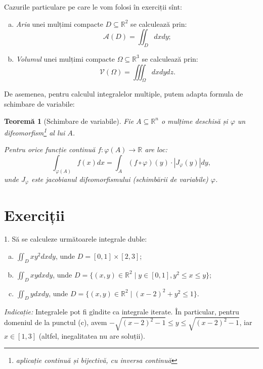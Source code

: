 \documentclass[11pt,a4paper]{article}
\newcommand\kal{\mathcal}
\newcommand\ds{\displaystyle}
\newcommand\seq{\subseteq}
\newcommand\RR{\mathbb{R}}
\theoremstyle{dotless}
\newtheorem{theorem}{Teorem\u{a}}[section]
\theoremstyle{dotlessdr}
\begin{document}
Cazurile particulare pe care le vom folosi în exerciții sînt:
\begin{enumerate}[(a)]
\item \emph{Aria} unei mulțimi compacte $D \seq \RR^2$ se calculează prin:
  \[
    \kal{A}(D) = \iint_D dxdy;
  \]
\item \emph{Volumul} unei mulțimi compacte $\Omega \seq \RR^3$ se calculează prin:
  \[
    \kal{V}(\Omega) = \iiint_\Omega dxdydz.
  \]
\end{enumerate}

De asemenea, pentru calculul integralelor multiple, putem adapta formula de
schimbare de variabile:

\begin{theorem}[Schimbare de variabile]\label{thm:sch-var}
  Fie $A \seq \RR^n$ o mulțime deschisă și $\varphi$ un difeomorfism\footnote{%
    aplicație continuă și bijectivă, cu inversa continuă} al lui $A$.

  Pentru orice funcție continuă $f : \varphi(A) \to \RR$ are loc:
  \[
    \int_{\varphi(A)} f(x) dx = \int_A (f \circ \varphi)(y) \cdot |J_\varphi(y)| dy,
  \]
  unde $J_\varphi$ este jacobianul difeomorfismului (schimbării de variabile) $\varphi$.
\end{theorem}


\section{Exerciții}

1. Să se calculeze următoarele integrale duble:
\begin{enumerate}[(a)]
\item $\ds\iint_D xy^2 dxdy$, unde $D = [0, 1] \times [2, 3]$;
\item $\ds\iint_D xy dxdy$, unde $D = \{(x, y) \in \RR^2 \mid y \in [0,1], y^2 \leq x \leq y \}$;
\item $\ds\iint_D ydxdy$, unde $D = \{(x, y) \in \RR^2 \mid (x - 2)^2 + y^2 \leq 1 \}$.
\end{enumerate}

\emph{Indicație:} Integralele pot fi gîndite ca integrale iterate. În particular, pentru
domeniul de la punctul (c), avem $-\sqrt{(x - 2)^2 - 1} \leq y \leq \sqrt{(x - 2)^2 - 1}$,
iar $x \in [1, 3]$ (altfel, inegalitatea nu are soluții).

\vspace{1cm}
\end{document}
